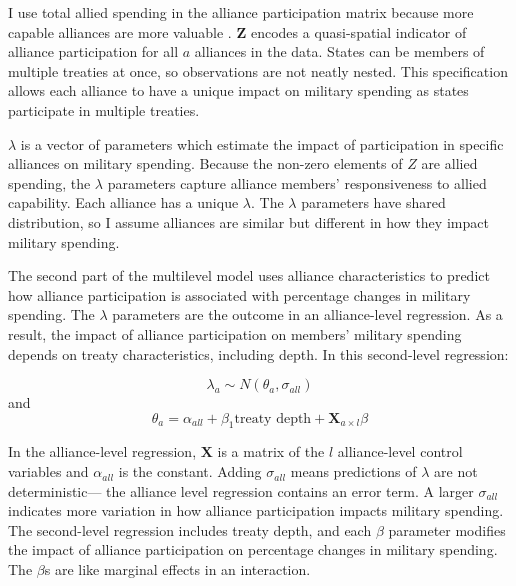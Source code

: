 \documentclass[12pt]{article}
\begin{document}
I use total allied spending in the alliance participation matrix because more capable alliances are more valuable \citep{Johnsonetal2015}. 
$\textbf{Z}$ encodes a quasi-spatial indicator of alliance participation for all $a$ alliances in the data. 
States can be members of multiple treaties at once, so observations are not neatly nested. 
This specification allows each alliance to have a unique impact on military spending as states participate in multiple treaties. 


$\lambda$ is a vector of parameters which estimate the impact of participation in specific alliances on military spending. 
Because the non-zero elements of $Z$ are allied spending, the $\lambda$ parameters capture alliance members' responsiveness to allied capability. 
Each alliance has a unique $\lambda$. 
The $\lambda$ parameters have shared distribution, so I assume alliances are similar but different in how they impact military spending. 


The second part of the multilevel model uses alliance characteristics to predict how alliance participation is associated with percentage changes in military spending. 
The $\lambda$ parameters are the outcome in an alliance-level regression.
As a result, the impact of alliance participation on members' military spending depends on treaty characteristics, including depth. 
In this second-level regression: 


\begin{equation}
\lambda_{a} \sim N(\theta_{a}, \sigma_{all})
\end{equation} 
and 
\begin{equation}
\theta_{a} = \alpha_{all} + \beta_1 \mbox{treaty depth} + \textbf{X}_{a \times l} \beta
\end{equation}


In the alliance-level regression, $\textbf{X}$ is a matrix of the $l$ alliance-level control variables and $\alpha_{all}$ is the constant.
Adding $\sigma_{all}$ means predictions of $\lambda$ are not deterministic--- the alliance level regression contains an error term. 
A larger $\sigma_{all}$ indicates more variation in how alliance participation impacts military spending. 
The second-level regression includes treaty depth, and each $\beta$ parameter modifies the impact of alliance participation on percentage changes in military spending. 
The $\beta$s are like marginal effects in an interaction. 
\end{document}
